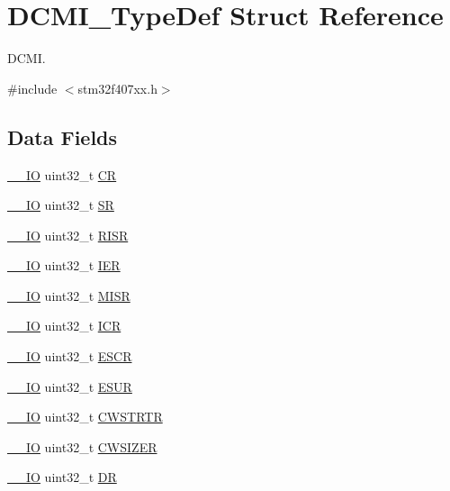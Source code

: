 \hypertarget{struct_d_c_m_i___type_def}{}\section{D\+C\+M\+I\+\_\+\+Type\+Def Struct Reference}
\label{struct_d_c_m_i___type_def}


D\+C\+MI.  




{\ttfamily \#include $<$stm32f407xx.\+h$>$}

\subsection*{Data Fields}
\begin{DoxyCompactItemize}
\item 
\hyperlink{core__sc300_8h_aec43007d9998a0a0e01faede4133d6be}{\+\_\+\+\_\+\+IO} uint32\+\_\+t \hyperlink{struct_d_c_m_i___type_def_ab40c89c59391aaa9d9a8ec011dd0907a}{CR}
\item 
\hyperlink{core__sc300_8h_aec43007d9998a0a0e01faede4133d6be}{\+\_\+\+\_\+\+IO} uint32\+\_\+t \hyperlink{struct_d_c_m_i___type_def_af6aca2bbd40c0fb6df7c3aebe224a360}{SR}
\item 
\hyperlink{core__sc300_8h_aec43007d9998a0a0e01faede4133d6be}{\+\_\+\+\_\+\+IO} uint32\+\_\+t \hyperlink{struct_d_c_m_i___type_def_aa196fddf0ba7d6e3ce29bdb04eb38b94}{R\+I\+SR}
\item 
\hyperlink{core__sc300_8h_aec43007d9998a0a0e01faede4133d6be}{\+\_\+\+\_\+\+IO} uint32\+\_\+t \hyperlink{struct_d_c_m_i___type_def_a6566f8cfbd1d8aa7e8db046aa35e77db}{I\+ER}
\item 
\hyperlink{core__sc300_8h_aec43007d9998a0a0e01faede4133d6be}{\+\_\+\+\_\+\+IO} uint32\+\_\+t \hyperlink{struct_d_c_m_i___type_def_a524e134cec519206cb41d0545e382978}{M\+I\+SR}
\item 
\hyperlink{core__sc300_8h_aec43007d9998a0a0e01faede4133d6be}{\+\_\+\+\_\+\+IO} uint32\+\_\+t \hyperlink{struct_d_c_m_i___type_def_a0a8c8230846fd8ff154b9fde8dfa0399}{I\+CR}
\item 
\hyperlink{core__sc300_8h_aec43007d9998a0a0e01faede4133d6be}{\+\_\+\+\_\+\+IO} uint32\+\_\+t \hyperlink{struct_d_c_m_i___type_def_a9cc4ec74be864c929261e0810f2fd7f0}{E\+S\+CR}
\item 
\hyperlink{core__sc300_8h_aec43007d9998a0a0e01faede4133d6be}{\+\_\+\+\_\+\+IO} uint32\+\_\+t \hyperlink{struct_d_c_m_i___type_def_af751d49ef824c1636c78822ecae066f4}{E\+S\+UR}
\item 
\hyperlink{core__sc300_8h_aec43007d9998a0a0e01faede4133d6be}{\+\_\+\+\_\+\+IO} uint32\+\_\+t \hyperlink{struct_d_c_m_i___type_def_a919b70dd8762e44263a02dfbafc7b8ce}{C\+W\+S\+T\+R\+TR}
\item 
\hyperlink{core__sc300_8h_aec43007d9998a0a0e01faede4133d6be}{\+\_\+\+\_\+\+IO} uint32\+\_\+t \hyperlink{struct_d_c_m_i___type_def_aa3ccc5d081bbee3c61ae9aa5e0c83af9}{C\+W\+S\+I\+Z\+ER}
\item 
\hyperlink{core__sc300_8h_aec43007d9998a0a0e01faede4133d6be}{\+\_\+\+\_\+\+IO} uint32\+\_\+t \hyperlink{struct_d_c_m_i___type_def_a3df0d8dfcd1ec958659ffe21eb64fa94}{DR}
\end{DoxyCompactItemize}


